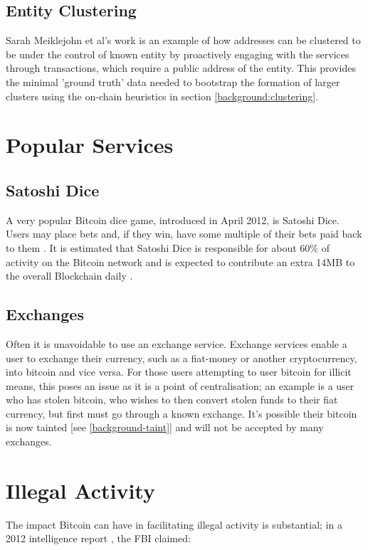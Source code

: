 \subsection{Entity Clustering}
Sarah Meiklejohn et al's work \cite{RefWorks:doc:5c3de7e3e4b0ea6196452d80} is an example of how addresses can be clustered to be under the control of known entity by proactively engaging with the services through transactions, which require a public address of the entity. This provides the minimal 'ground truth' data needed to bootstrap the formation of larger clusters using the on-chain heuristics in section \ref{background:clustering}.

\section{Popular Services}
\subsection{Satoshi Dice}
A very popular Bitcoin dice game, introduced in April 2012, is Satoshi Dice. Users may place bets and, if they win, have some multiple of their bets paid back to them \cite{Refworks:doc:5c3de7e3e4b0ea6196452d80}. It is estimated that Satoshi Dice is responsible for about 60\% of activity on the Bitcoin network and is expected to contribute an extra 14MB to the overall Blockchain daily \cite{Refworks:doc:5c3de7e3e4b0ea6196452d80}. 

\subsection{Exchanges}
Often it is unavoidable to use an exchange service. Exchange services enable a user to exchange their currency, such as a \gls{fiat-money} or another cryptocurrency, into bitcoin and vice versa. For those users attempting to user bitcoin for illicit means, this poses an issue as it is a point of centralisation; an example is a user who has stolen bitcoin, who wishes to then convert stolen funds to their fiat currency, but first must go through a known exchange. It's possible their bitcoin is now tainted [see \ref{background-taint}] and will not be accepted by many exchanges. 

\section{Illegal Activity}

The impact Bitcoin can have in facilitating illegal activity is substantial; in a 2012 intelligence report \cite{RefWorks:doc:5c4ad055e4b0ea619646c15a}, the FBI claimed: 

